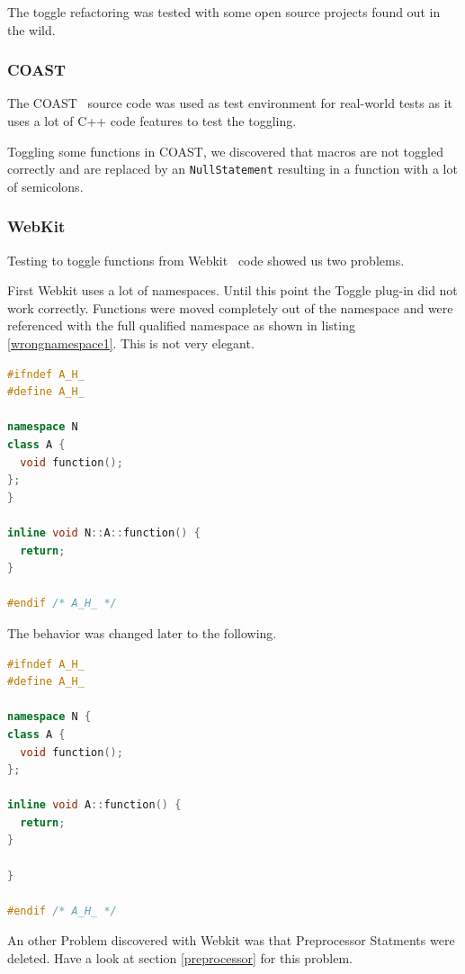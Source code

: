 The toggle refactoring was tested with some open source projects found out in
the wild.

\subsubsection{COAST}
The COAST~\cite{COAST} source code was used as test environment for real-world 
tests as it uses a lot of C++ code features to test the toggling.

Toggling some functions in COAST, we discovered that macros are not toggled
correctly and are replaced by an \texttt{NullStatement} resulting in a function
with a lot of semicolons.

\subsubsection{WebKit}
Testing to toggle functions from Webkit~\cite{Webkit} code showed us two
problems.

First Webkit uses a lot of namespaces. Until this point the Toggle
plug-in did not work correctly. Functions were moved completely out of the
namespace and were referenced with the full qualified namespace as shown in
listing \ref{wrongnamespace1}. This is not very elegant.

\begin{lstlisting}[caption={\texttt{function()} with reference to namespace},
label={wrongnamespace1}, language=C++]
#ifndef A_H_
#define A_H_

namespace N
class A {
  void function();
};
}

inline void N::A::function() {
  return;
}

#endif /* A_H_ */
\end{lstlisting}

The behavior was changed later to the following.

\begin{lstlisting}[caption={A.h, function definition in namespace},
label={wrongnamespace2}, language=C++]
#ifndef A_H_
#define A_H_

namespace N {
class A {
  void function();
};

inline void A::function() {
  return;
}

}

#endif /* A_H_ */
\end{lstlisting}

An other Problem discovered with Webkit was that Preprocessor Statments were
deleted. Have a look at section \ref{preprocessor} for this problem.

